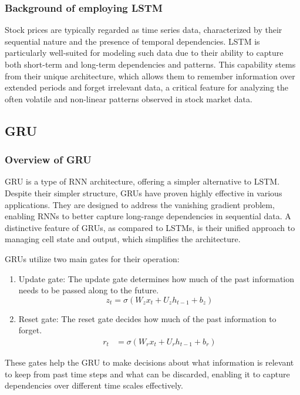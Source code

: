 \subsubsection{Background of employing LSTM}

Stock prices are typically regarded as time series data, characterized by their sequential nature and the presence of temporal dependencies. 
LSTM is particularly well-suited for modeling such data due to their ability to capture both short-term and long-term dependencies and patterns. 
This capability stems from their unique architecture, which allows them to remember information over extended periods and forget irrelevant data, a critical feature for analyzing the often volatile and non-linear patterns observed in stock market data.

\subsection{GRU}
\subsubsection{Overview of GRU}

GRU is a type of RNN architecture, offering a simpler alternative to LSTM. 
Despite their simpler structure, GRUs have proven highly effective in various applications. They are designed to address the vanishing gradient problem, enabling RNNs to better capture long-range dependencies in sequential data. 
A distinctive feature of GRUs, as compared to LSTMs, is their unified approach to managing cell state and output, which simplifies the architecture.

GRUs utilize two main gates for their operation:
\begin{enumerate}
	\item Update gate: 	The update gate determines how much of the past information needs to be passed along to the future.
	\begin{equation}
		z_{t} = \sigma(W_{z}x_{t} + U_{z}h_{t-1} + b_{z})
	\end{equation}
	\item Reset gate:	The reset gate decides how much of the past information to forget.
	\begin{align}
		r_{t} &= \sigma(W_{r}x_{t} + U_{r}h_{t-1} + b_{r})
	\end{align}
\end{enumerate}
These gates help the GRU to make decisions about what information is relevant to keep from past time steps and what can be discarded, 
enabling it to capture dependencies over different time scales effectively.


